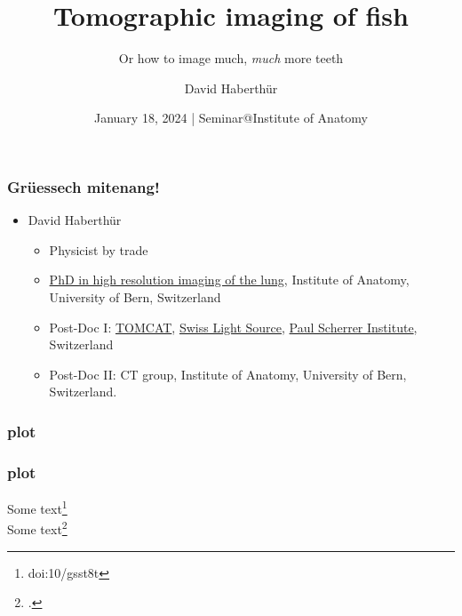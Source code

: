 \documentclass[aspectratio=169]{beamer}
\title{Tomographic imaging of fish}
\subtitle{Or how to image much, \emph{much} more teeth}
\author{David Haberthür}
\institute{Institute of Anatomy\\Universität Bern}
\date{January 18, 2024 | Seminar@Institute of Anatomy}
\newcommand{\uct}{{\textmu}CT\xspace}%
\begin{document}
{%
	\begin{frame}[noframenumbering]
		\maketitle
	\end{frame}%
}

%
%

\begin{frame}
	\frametitle{Grüessech mitenang!}
	\begin{itemize}
		\item David Haberthür
		\begin{itemize}
			\item Physicist by trade
			\item \href{https://boris.unibe.ch/2619/}{PhD in high resolution imaging of the lung}, Institute of Anatomy, University of Bern, Switzerland
			\item Post-Doc I: \href{https://www.psi.ch/sls/tomcat/}{TOMCAT}, \href{https://www.psi.ch/sls/}{Swiss Light Source}, \href{https://www.psi.ch/}{Paul Scherrer Institute}, Switzerland
			\item Post-Doc II: \uct{} group, Institute of Anatomy, University of Bern, Switzerland.
		\end{itemize}
	\end{itemize}
\end{frame}

\begin{frame}
\frametitle{plot}

\end{frame}

\begin{frame}
\frametitle{plot}
Some text\footnote{doi:10/gsst8t}\\
Some text\footcite{Haberthuer2023}
\end{frame}
\end{document}
